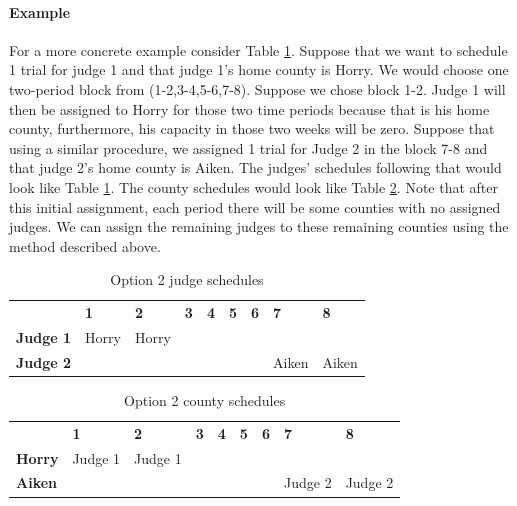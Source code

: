 \documentclass[11pt]{article}
\begin{document}
    \paragraph{Example}
    For a more concrete example consider Table \ref{tab:first-sched}. Suppose that we want to schedule 1 trial for judge 1 and that judge 1's home county is Horry. We would choose one two-period block from (1-2,3-4,5-6,7-8). Suppose we chose block 1-2. Judge 1 will then be assigned to Horry for those two time periods because that is his home county, furthermore, his capacity in those two weeks will be zero. Suppose that using a similar procedure, we assigned 1 trial for Judge 2 in the block 7-8 and that judge 2's home county is Aiken. The judges' schedules following that would look like Table \ref{tab:first-sched}. The county schedules would look like Table \ref{tab:county-sched}. Note that after this initial assignment, each period there will be some counties with no assigned judges. We can assign the remaining judges to these remaining counties using the method described above.

    \begin{table}[H]
      \centering
      \caption{Option 2 judge schedules}
      \label{tab:first-sched}
      \begin{tabular}{lllllllll}
                       & \textbf{1} & \textbf{2} & \textbf{3} & \textbf{4} & \textbf{5} & \textbf{6} & \textbf{7} & \textbf{8} \\
      \textbf{Judge 1} & Horry      & Horry      &            &            &            &            &            &            \\
      \textbf{Judge 2} &            &            &            &            &            &            & Aiken      & Aiken
      \end{tabular}
    \end{table}

    \begin{table}[H]
      \centering
      \caption{Option 2 county schedules}
      \label{tab:county-sched}
      \begin{tabular}{lllllllll}
                     & \textbf{1} & \textbf{2} & \textbf{3} & \textbf{4} & \textbf{5} & \textbf{6} & \textbf{7} & \textbf{8} \\
      \textbf{Horry} & Judge 1          & Judge 1          &            &            &            &            &            &            \\
      \textbf{Aiken} &            &            &            &            &            &            & Judge 2          & Judge 2
      \end{tabular}
    \end{table}
\end{document}
